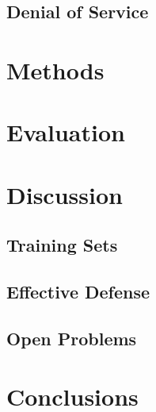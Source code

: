 \documentclass{acm_proc_article-sp}
\begin{document}
    \subsection{Denial of Service}

\section{Methods}

\section{Evaluation}

\section{Discussion}
    \subsection{Training Sets}
    \subsection{Effective Defense}
    \subsection{Open Problems}

\section{Conclusions}

	

{}  %
\nocite{*}
%
%
\balancecolumns
\end{document}
